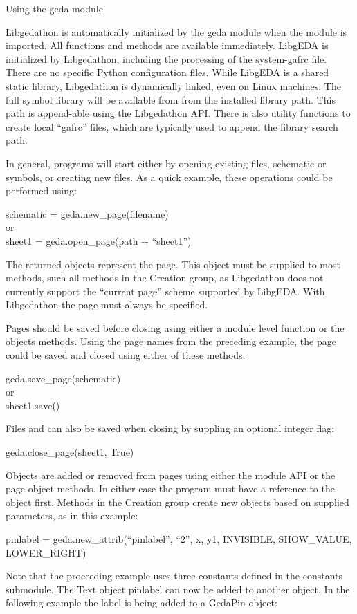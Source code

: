  Using the geda module. 

  Libgedathon is automatically initialized by the geda module when the module is imported. All functions and methods are available immediately. LibgEDA is initialized by Libgedathon, including the processing of the system-gafrc file. There are no specific Python configuration files. While LibgEDA is a shared static library, Libgedathon is dynamically linked, even on Linux machines. The full symbol library will be available from from the installed library path. This path is append-able using the Libgedathon API. There is also utility functions to create local ``gafrc'' files, which are typically used to append the library search path. 


  In general, programs will start either by opening existing files, schematic or symbols, or creating new files. As a quick example, these operations could be performed using:

schematic = geda.new\_page(filename)\\ 
 or\\ 
sheet1 = geda.open\_page(path + ``sheet1'')


  The returned objects represent the page. This object must be supplied to most methods, such all methods in the Creation group, as Libgedathon does not currently support the ``current page'' scheme supported by LibgEDA. With Libgedathon the page must always be specified. 


  Pages should be saved before closing using either a module level function or the objects methods. Using the page names from the preceding example, the page could be saved and closed using either of these methods:

geda.save\_page(schematic)\\ 
 or\\ 
sheet1.save()


  Files and can also be saved when closing by suppling an optional integer flag:

geda.close\_page(sheet1, True)

  Objects are added or removed from pages using either the module API or the page object methods. In either case the program must have a reference to the object first. Methods in the Creation group create new objects based on supplied parameters, as in this example:

pinlabel = geda.new\_attrib(``pinlabel'', ``2'', x, y1, INVISIBLE, SHOW\_VALUE, LOWER\_RIGHT)

  Note that the proceeding example uses three constants defined in the constants submodule. The Text object pinlabel can now be added to another object. In the following example the label is being added to a GedaPin object:

